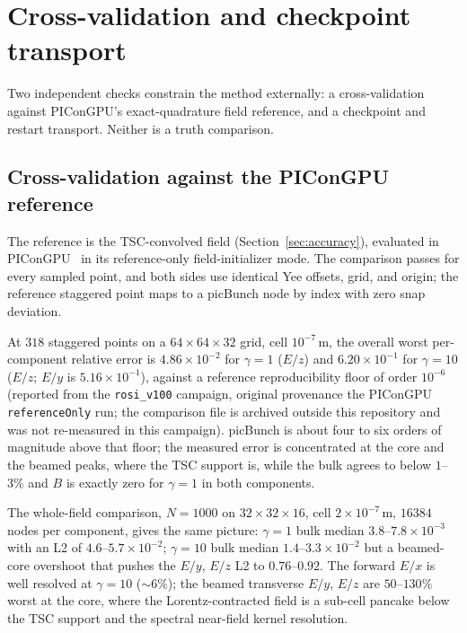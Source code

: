 \section{Cross-validation and checkpoint transport}
\label{sec:validation}

Two independent checks constrain the method externally: a cross-validation
against PIConGPU's exact-quadrature field reference, and a checkpoint and
restart transport. Neither is a truth comparison.

\subsection{Cross-validation against the PIConGPU reference}

The reference is the TSC-convolved field (Section~\ref{sec:accuracy}),
evaluated in PIConGPU~\citep{burau2010} in its reference-only
field-initializer mode. The comparison passes for every sampled point, and
both sides use identical Yee offsets, grid, and origin; the reference
staggered point maps to a picBunch node by index with zero snap deviation.

At $318$ staggered points on a $64\times64\times32$ grid, cell
$10^{-7}$\,m, the overall worst per-component relative error is
$4.86\times10^{-2}$ for $\gamma=1$ ($E/z$) and $6.20\times10^{-1}$ for
$\gamma=10$ ($E/z$; $E/y$ is $5.16\times10^{-1}$), against a reference
reproducibility floor of order $10^{-6}$ (reported from the
\texttt{rosi\_v100} campaign, original provenance the PIConGPU
\texttt{referenceOnly} run; the comparison file is archived outside this
repository and was not re-measured in this campaign). picBunch is about four
to six orders of
magnitude above that floor; the measured error is concentrated at the core
and the beamed peaks, where the TSC support is, while the bulk agrees to
below $1$--$3\%$ and $B$ is exactly zero for $\gamma=1$ in both components.

The whole-field comparison, $N=1000$ on $32\times32\times16$, cell
$2\times10^{-7}$\,m, $16384$ nodes per component, gives the same picture:
$\gamma=1$ bulk median $3.8$--$7.8\times10^{-3}$ with an L2 of
$4.6$--$5.7\times10^{-2}$; $\gamma=10$ bulk median $1.4$--$3.3\times10^{-2}$
but a beamed-core overshoot that pushes the $E/y$, $E/z$ L2 to
$0.76$--$0.92$. The forward $E/x$ is well resolved at $\gamma=10$
($\sim6\%$); the beamed transverse $E/y$, $E/z$ are $50$--$130\%$ worst at
the core, where the Lorentz-contracted field is a sub-cell pancake below
the TSC support and the spectral near-field kernel resolution.


